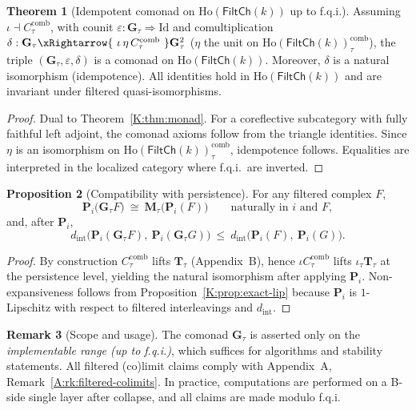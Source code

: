\documentclass[11pt]{article}
\numberwithin{equation}{section}
\theoremstyle{plain}
\theoremstyle{definition}
\theoremstyle{remark}
\DeclareRobustCommand{\hyp}{\nobreakdash-}
\newcommand{\Ho}{\mathrm{Ho}}
\theoremstyle{plain}
\theoremstyle{definition}
\numberwithin{equation}{section}
\newtheorem{theorem}{Theorem}[section]
\newtheorem{proposition}[theorem]{Proposition}
\theoremstyle{definition}
\newtheorem{remark}[theorem]{Remark}
\numberwithin{equation}{section}
\theoremstyle{plain}
\theoremstyle{definition}
\theoremstyle{remark}
\begin{document}
\begin{theorem}[Idempotent comonad on \(\Ho(\mathsf{FiltCh}(k))\) up to f.q.i.]\label{K:thm:comonad}
Assuming \(\iota\dashv C_\tau^{\mathrm{comb}}\), with counit \(\varepsilon:\mathbf{G}_\tau\Rightarrow \mathrm{Id}\) and comultiplication
\(\delta:\mathbf{G}_\tau\xRightarrow{\ \iota\,\eta\,C_\tau^{\mathrm{comb}}\ }\mathbf{G}_\tau^2\)
(\(\eta\) the unit on \(\Ho(\mathsf{FiltCh}(k))_\tau^{\mathrm{comb}}\)), the triple \((\mathbf{G}_\tau,\varepsilon,\delta)\) is a comonad on \(\Ho(\mathsf{FiltCh}(k))\).
Moreover, \(\delta\) is a natural isomorphism (idempotence).
All identities hold in \(\Ho(\mathsf{FiltCh}(k))\) and are invariant under filtered quasi\hyp isomorphisms.
\end{theorem}

\begin{proof}
Dual to Theorem~\ref{K:thm:monad}. For a coreflective subcategory with fully faithful left adjoint, the comonad axioms follow from the triangle identities. Since \(\eta\) is an isomorphism on \(\Ho(\mathsf{FiltCh}(k))_\tau^{\mathrm{comb}}\), idempotence follows. Equalities are interpreted in the localized category where f.q.i.\ are inverted.
\end{proof}

\begin{proposition}[Compatibility with persistence]\label{K:prop:compat}
For any filtered complex \(F\),
\[
\mathbf{P}_i\big(\mathbf{G}_\tau F\big)\ \cong\ \mathbf{M}_\tau\big(\mathbf{P}_i(F)\big)\qquad\text{naturally in \(i\) and \(F\)},
\]
and, after \(\mathbf{P}_i\),
\[
d_{\mathrm{int}}\!\big(\mathbf{P}_i(\mathbf{G}_\tau F),\ \mathbf{P}_i(\mathbf{G}_\tau G)\big)\ \le\ d_{\mathrm{int}}\!\big(\mathbf{P}_i(F),\ \mathbf{P}_i(G)\big).
\]
\end{proposition}

\begin{proof}
By construction \(C_\tau^{\mathrm{comb}}\) lifts \(\mathbf{T}_\tau\) (Appendix~B), hence \(\iota C_\tau^{\mathrm{comb}}\) lifts \(\iota_\tau \mathbf{T}_\tau\) at the persistence level, yielding the natural isomorphism after applying \(\mathbf{P}_i\). Non\hyp expansiveness follows from Proposition~\ref{K:prop:exact-lip} because \(\mathbf{P}_i\) is \(1\)\hyp Lipschitz with respect to filtered interleavings and \(d_{\mathrm{int}}\).
\end{proof}

\begin{remark}[Scope and usage]\label{K:rk:scope}
The comonad \(\mathbf{G}_\tau\) is asserted only on the \emph{implementable range (up to f.q.i.)}, which suffices for algorithms and stability statements. All filtered (co)limit claims comply with Appendix~A, Remark~\ref{A:rk:filtered-colimits}. In practice, computations are performed on a B\hyp side single layer after collapse, and all claims are made modulo f.q.i.
\end{remark}
\end{document}
